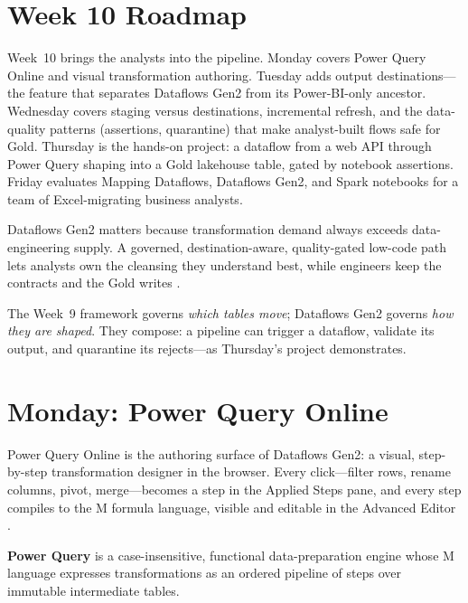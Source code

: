 \section{Week 10 Roadmap}
Week~10 brings the analysts into the pipeline. Monday covers Power Query Online and visual transformation authoring. Tuesday adds output destinations---the feature that separates Dataflows Gen2 from its Power-BI-only ancestor. Wednesday covers staging versus destinations, incremental refresh, and the data-quality patterns (assertions, quarantine) that make analyst-built flows safe for Gold. Thursday is the hands-on project: a dataflow from a web API through Power Query shaping into a Gold lakehouse table, gated by notebook assertions. Friday evaluates Mapping Dataflows, Dataflows Gen2, and Spark notebooks for a team of Excel-migrating business analysts.

Dataflows Gen2 matters because transformation demand always exceeds data-engineering supply. A governed, destination-aware, quality-gated low-code path lets analysts own the cleansing they understand best, while engineers keep the contracts and the Gold writes \cite{microsoftFabricDataflows}.

\begin{notebox}
The Week~9 framework governs \emph{which tables move}; Dataflows Gen2 governs \emph{how they are shaped}. They compose: a pipeline can trigger a dataflow, validate its output, and quarantine its rejects---as Thursday's project demonstrates.
\end{notebox}

\section{Monday: Power Query Online}
Power Query Online is the authoring surface of Dataflows Gen2: a visual, step-by-step transformation designer in the browser. Every click---filter rows, rename columns, pivot, merge---becomes a step in the Applied Steps pane, and every step compiles to the M formula language, visible and editable in the Advanced Editor \cite{microsoftFabricDataflows}.

\begin{definitionbox}
\textbf{Power Query} is a case-insensitive, functional data-preparation engine whose M language expresses transformations as an ordered pipeline of steps over immutable intermediate tables.
\end{definitionbox}

